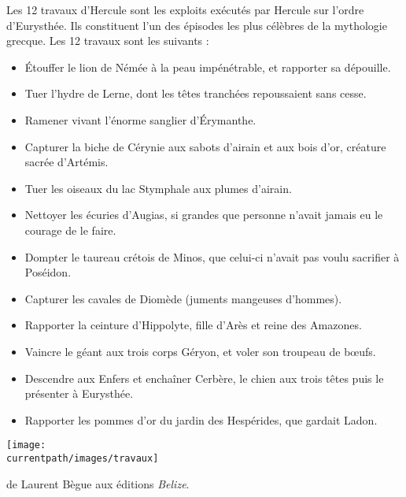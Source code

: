 \vspace*{-10mm}
\begin{changemargin}{-10mm}{-10mm}
   
   \vspace*{-5mm}
   \begin{debat} 
      \vspace*{-8mm}
      Les 12 travaux d'Hercule sont les exploits exécutés par Hercule sur l'ordre d'Eurysthée. Ils constituent l'un des épisodes les plus célèbres de la mythologie grecque. Les 12 travaux sont les suivants :
      \begin{itemize}
         \item Étouffer le lion de Némée à la peau impénétrable, et rapporter sa dépouille.
         \item Tuer l'hydre de Lerne, dont les têtes tranchées repoussaient sans cesse.
         \item Ramener vivant l'énorme sanglier d'Érymanthe.
         \item Capturer la biche de Cérynie aux sabots d'airain et aux bois d'or, créature sacrée d'Artémis.
         \item Tuer les oiseaux du lac Stymphale aux plumes d'airain.
         \item Nettoyer les écuries d'Augias, si grandes que personne n'avait jamais eu le courage de le faire.
         \item Dompter le taureau crétois de Minos, que celui-ci n'avait pas voulu sacrifier à Poséidon.
         \item Capturer les cavales de Diomède (juments mangeuses d'hommes).
         \item Rapporter la ceinture d'Hippolyte, fille d'Arès et reine des Amazones.
         \item Vaincre le géant aux trois corps Géryon, et voler son troupeau de bœufs.
         \item Descendre aux Enfers et enchaîner Cerbère, le chien aux trois têtes puis le présenter à Eurysthée.
         \item Rapporter les pommes d'or du jardin des Hespérides, que gardait Ladon.
      \end{itemize}
      \begin{center} 
         \texttt{[image: \\currentpath/images/travaux]}
      \end{center}
      \begin{cadre}[B2][F4]
         \begin{center}
             de Laurent Bègue aux éditions {\it Belize}.
         \end{center}
      \end{cadre}
   \end{debat}   
   \vspace*{-25mm}
\end{changemargin}
